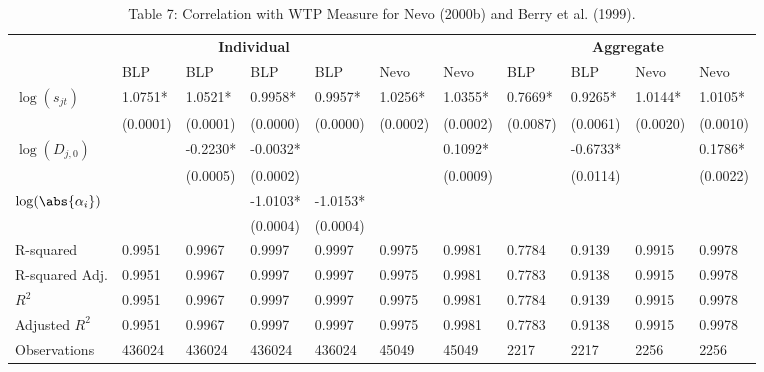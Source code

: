 \begin{table}
\caption*{Table 7: Correlation with WTP Measure for Nevo (2000b) and Berry et al. (1999).}
\label{}
\begin{center}
\begin{tabular}{lllllllllll}
\toprule \multicolumn{7}{c|}{\textbf{Individual}} & \multicolumn{4}{c}{\textbf{Aggregate}} \\ 
               & BLP       & BLP        & BLP        & BLP        & Nevo      & Nevo      & BLP       & BLP        & Nevo      & Nevo       \\
\bottomrule
$\log(s_{jt})$        & 1.0751* & 1.0521*  & 0.9958*  & 0.9957*  & 1.0256* & 1.0355* & 0.7669* & 0.9265*  & 1.0144* & 1.0105*  \\
               & (0.0001)  & (0.0001)   & (0.0000)   & (0.0000)   & (0.0002)  & (0.0002)  & (0.0087)  & (0.0061)   & (0.0020)  & (0.0010)   \\
$\log(D_{j,0})$          &           & -0.2230* & -0.0032* &            &           & 0.1092* &           & -0.6733* &           & 0.1786*  \\
               &           & (0.0005)   & (0.0002)   &            &           & (0.0009)  &           & (0.0114)   &           & (0.0022)   \\
$\log(\abs{\alpha_i})$         &           &            & -1.0103* & -1.0153* &           &           &           &            &           &            \\
               &           &            & (0.0004)   & (0.0004)   &           &           &           &            &           &            \\
R-squared      & 0.9951    & 0.9967     & 0.9997     & 0.9997     & 0.9975    & 0.9981    & 0.7784    & 0.9139     & 0.9915    & 0.9978     \\
R-squared Adj. & 0.9951    & 0.9967     & 0.9997     & 0.9997     & 0.9975    & 0.9981    & 0.7783    & 0.9138     & 0.9915    & 0.9978     \\
 \hline $R^2$           & 0.9951    & 0.9967     & 0.9997     & 0.9997     & 0.9975    & 0.9981    & 0.7784    & 0.9139     & 0.9915    & 0.9978     \\
Adjusted $R^2$  & 0.9951    & 0.9967     & 0.9997     & 0.9997     & 0.9975    & 0.9981    & 0.7783    & 0.9138     & 0.9915    & 0.9978     \\
Observations   & 436024    & 436024     & 436024     & 436024     & 45049     & 45049     & 2217      & 2217       & 2256      & 2256       \\
\hline
\end{tabular}
\end{center}
\end{table}